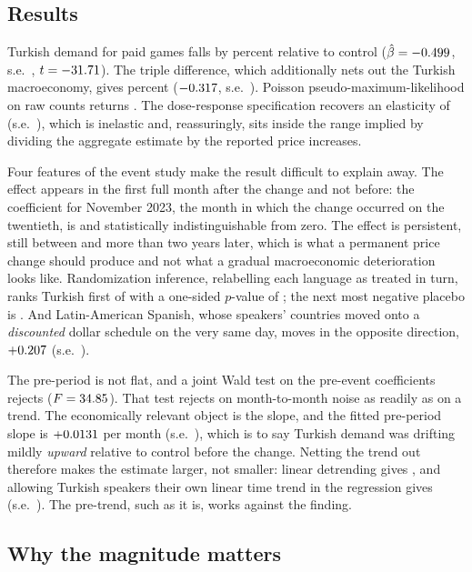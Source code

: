 \documentclass[11pt]{article}
\begin{document}
\subsection*{Results}

Turkish demand for paid games falls by \pctDiD{} percent relative to control
($\hat\beta = -0.499$, s.e.\ \seDiD, $t = -31.71$). The triple difference, which additionally nets
out the Turkish macroeconomy, gives \pctDDD{} percent ($-0.317$, s.e.\ \seDDD). Poisson
pseudo-maximum-likelihood on raw counts returns \bPPML. The dose-response specification recovers
an elasticity of \bDose{} (s.e.\ \seDose), which is inelastic and, reassuringly, sits inside the
range implied by dividing the aggregate estimate by the reported price increases.

Four features of the event study make the result difficult to explain away. The effect appears in
the first full month after the change and not before: the coefficient for November 2023, the month
in which the change occurred on the twentieth, is \bKzero{} and statistically indistinguishable
from zero. The effect is persistent, still between \tailHi{} and \tailLo{} more than two years later, which is
what a permanent price change should produce and not what a gradual macroeconomic deterioration
looks like. Randomization inference, relabelling each language as treated in turn, ranks Turkish
first of \riN{} with a one-sided $p$-value of \riP; the next most negative placebo is \riNext. And
Latin-American Spanish, whose speakers' countries moved onto a \emph{discounted} dollar schedule
on the very same day, moves in the opposite direction, $+0.207$ (s.e.\ \seLatam).

The pre-period is not flat, and a joint Wald test on the pre-event coefficients rejects
($F = 34.85$). That test rejects on month-to-month noise as readily as on a trend. The economically relevant object is the slope, and the fitted pre-period
slope is $+0.0131$ per month (s.e.\ \preSlopeSE), which is to say Turkish demand was drifting
mildly \emph{upward} relative to control before the change. Netting the trend out therefore makes
the estimate larger, not smaller: linear detrending gives \bDetrend, and allowing Turkish speakers
their own linear time trend in the regression gives \bTrend{} (s.e.\ \seTrend). The pre-trend, such
as it is, works against the finding.

\subsection*{Why the magnitude matters}
\end{document}
